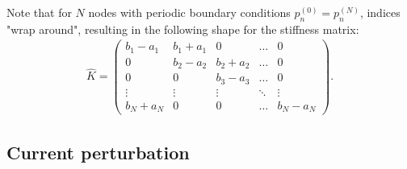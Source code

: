 \documentclass[a4paper, twoside, 10pt, english]{article}
\numberwithin{equation}{section}
\begin{document}
Note that for $N$ nodes with periodic boundary conditions $p_{n}^{(0)} = p_{n}^{(N)}$, indices "wrap around", resulting in the following shape for the stiffness matrix:
\begin{gather*}
  \hat{K} = \begin{pmatrix}
    b_{1} - a_{1} &  b_{1} + a_{1} &        0       & \hdots &    0   \\
           0       & b_{2} - a_{2} &  b_{2} + a_{2} & \hdots &    0   \\
           0       &        0       & b_{3} - a_{3} & \hdots &    0   \\
        \vdots     &     \vdots     &     \vdots     & \ddots & \vdots \\
     b_{N} + a_{N} &        0       &        0       & \hdots & b_{N} - a_{N}
  \end{pmatrix}.
\end{gather*}

\subsection{Current perturbation}
\label{sec:compute_currn}
\end{document}
